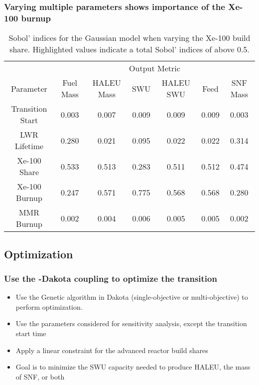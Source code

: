 \begin{frame}
    \frametitle{Varying multiple parameters shows importance of the 
    Xe-100 burnup}
    \begin{table}
        \centering
        \caption{Sobol' indices for the Gaussian model when varying the 
        Xe-100 build share. Highlighted 
        values indicate a total Sobol' indices of above 0.5.}
        \label{tab:s7_sobol_xe100_gaussian}
        \begin{tabular}{c c c c c c c}
            \hline
            & \multicolumn{6}{c}{Output Metric} \\
            Parameter & Fuel Mass & HALEU Mass & SWU & HALEU SWU & Feed & SNF Mass \\
            \hline
            Transition Start & 0.003 & 0.007 & 0.009 &
                               0.009 & 0.009 & 0.003\\
            LWR Lifetime & 0.280 & 0.021 & 0.095 &
                           0.022 & 0.022 & 0.314\\
            Xe-100 Share & \cellcolor{green!25}0.533 & \cellcolor{green!25}0.513 & 0.283 &
            \cellcolor{green!25}0.511 & \cellcolor{green!25}0.512 & 0.474\\
            Xe-100 Burnup & 0.247 & \cellcolor{green!25}0.571 & \cellcolor{green!25}0.775 & 
            \cellcolor{green!25}0.568 & \cellcolor{green!25}0.568 & 0.280\\
            MMR Burnup & 0.002 & 0.004 & 0.006 & 
                         0.005 & 0.005 & 0.002\\
            \hline        
        \end{tabular}
    \end{table}
\end{frame}

\subsection{Optimization}
\begin{frame}
    \frametitle{Use the \Cyclus-Dakota coupling to optimize the transition}
    \begin{itemize}
        \item Use the Genetic algorithm in Dakota (single-objective or 
        multi-objective) to perform optimization.
        \item Use the parameters considered for sensitivity analysis, 
              except the transition start time
        \item Apply a linear constraint for the advanced reactor build shares
        \item Goal is to minimize the SWU capacity needed to 
             produce HALEU, the mass of SNF, or both
    \end{itemize}
\end{frame}

